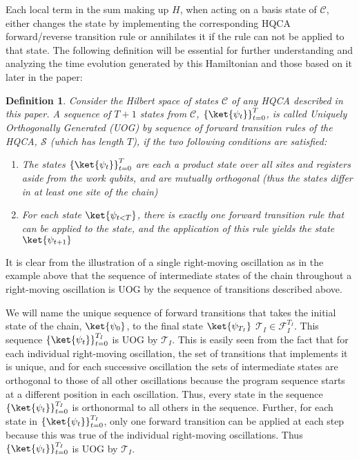 \documentclass[11pt,letterpaper]{article}
\newtheorem{definition}[theorem]{Definition}
\newcommand{\<}{\langle}
\renewcommand{\>}{\rangle}
\begin{document}
Each local term in the sum making up $H$, when acting on a basis state of $\mathcal{C}$, either changes the state by implementing the corresponding HQCA forward/reverse transition rule or annihilates it if the rule can not be applied to that state. The following definition will be essential for further understanding and analyzing the time evolution generated by this Hamiltonian and those based on it later in the paper:
\begin{definition}\label{uog}
	Consider the Hilbert space of states $\mathcal{C}$ of any HQCA described in this paper. A sequence of $T+1$ states from $\mathcal{C}$, $\left\{\ket{\psi_t}\right\}_{t=0}^{T}$, is called \emph{Uniquely Orthogonally Generated} (UOG) by sequence of forward transition rules of the HQCA, $\mathcal{S}$ (which has length $T$), if the two following conditions are satisfied:
	\begin{enumerate}
		\item The states $\left\{\ket{\psi_t}\right\}_{t=0}^{T}$ are each a product state over all sites and registers aside from the work qubits, and are mutually orthogonal (thus the states differ in at least one site of the chain)
		\item For each state $\ket{\psi_{t<T}}$, there is exactly one forward transition rule that can be applied to the state, and the application of this rule yields the state $\ket{\psi_{t+1}}$
	\end{enumerate}
\end{definition}

It is clear from the illustration of a single right-moving oscillation as in the example above that the sequence of intermediate states of the chain throughout a right-moving oscillation is UOG by the sequence of transitions described above.

We will name the unique sequence of forward transitions that takes the initial state of the chain, $\ket{\psi_0}$, to the final state $\ket{\psi_{T_{I}}}$ $\mathcal{T}_{I}\in \mathcal{F}^{T_{I}}_I$. This sequence $\left\{\ket{\psi_t}\right\}_{t=0}^{T_I}$ is UOG by $\mathcal{T}_{I}$. This is easily seen from the fact that for each individual right-moving oscillation, the set of transitions that implements it is unique, and for each successive oscillation the sets of intermediate states are orthogonal to those of all other oscillations because the program sequence starts at a different position in each oscillation. Thus, every state in the sequence $\left\{\ket{\psi_{t}}\right\}_{t=0}^{T_I}$ is orthonormal to all others in the sequence. Further, for each state in $\left\{\ket{\psi_{t}}\right\}_{t=0}^{T_I}$, only one forward transition can be applied at each step because this was true of the individual right-moving oscillations. Thus $\left\{\ket{\psi_t}\right\}_{t=0}^{T_I}$ is UOG by $\mathcal{T}_{I}$.
\end{document}
